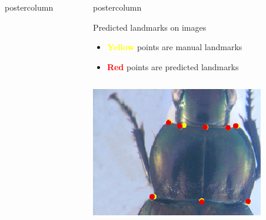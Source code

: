 \begin{frame}
\begin{columns}
\begin{column}{.49\textwidth}
\begin{beamercolorbox}[center,wd=\textwidth]{postercolumn}
\begin{minipage}[T]{.95\textwidth}
{          }
        \end{minipage}
      \end{beamercolorbox}
    \end{column}
    \begin{column}{.49\textwidth}
      \begin{beamercolorbox}[center,wd=\textwidth]{postercolumn}
        \begin{minipage}[T]{.95\textwidth}
          \parbox[t][\columnheight]{\textwidth}{
            
            \begin{block}{Predicted landmarks on images}
            	\begin{itemize}
            		\item \textbf{\textcolor{yellow}{Yellow}} points are manual landmarks
            		\item \textbf{\textcolor{red}{Red}} points are predicted landmarks
            	\end{itemize}
            	\begin{columns}
            		\begin{column}{.45\textwidth}
            			\centering
            			\includegraphics[width=.95\textwidth]{images/Prono_115.eps}
            		\end{column}
            		\begin{column}{.45\textwidth}
            			\centering

\end{column}
\end{columns}
\end{block}}
\end{minipage}
\end{beamercolorbox}
\end{column}
\end{columns}
\end{frame}
